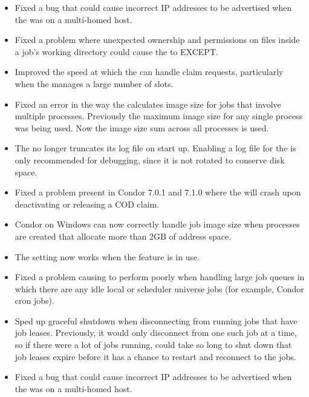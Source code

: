 \begin{itemize}
\item Fixed a bug that could cause incorrect IP addresses to be advertised
when the  was on a multi-homed host.

\item Fixed a problem where unexpected ownership and permissions on files
inside a job's working directory could cause the  to EXCEPT.

\item Improved the speed at which the  can handle claim
requests, particularly when the  manages a large number
of slots.

\item Fixed an error in the way the  calculates image size for
jobs that involve multiple processes. Previously the maximum image size for
any single process was being used. Now the image size sum across all
processes is used.

\item The  no longer truncates its log file on start up.
  Enabling a log file for the  is only recommended for
  debugging, since it is not rotated to conserve disk space.

\item Fixed a problem present in Condor 7.0.1 and 7.1.0 where the
 will crash upon deactivating or releasing a COD claim.

\item Condor on Windows can now correctly handle job image size when
processes are created that allocate more than 2GB of address space.

\item The  setting now works when
the  feature is in use.

\item Fixed a problem causing  to perform poorly when
handling large job queues in which there are any idle local or
scheduler universe jobs (for example, Condor cron jobs).

\item Sped up  graceful shutdown when disconnecting
from running jobs that have job leases.  Previously, it would only
disconnect from one such job at a time, so if there were a lot of jobs
running,  could take so long to shut down that job leases
expire before it has a chance to restart and reconnect to the jobs.

\item Fixed a bug that could cause incorrect IP addresses to be advertised
when the  was on a multi-homed host.

\end{itemize}

